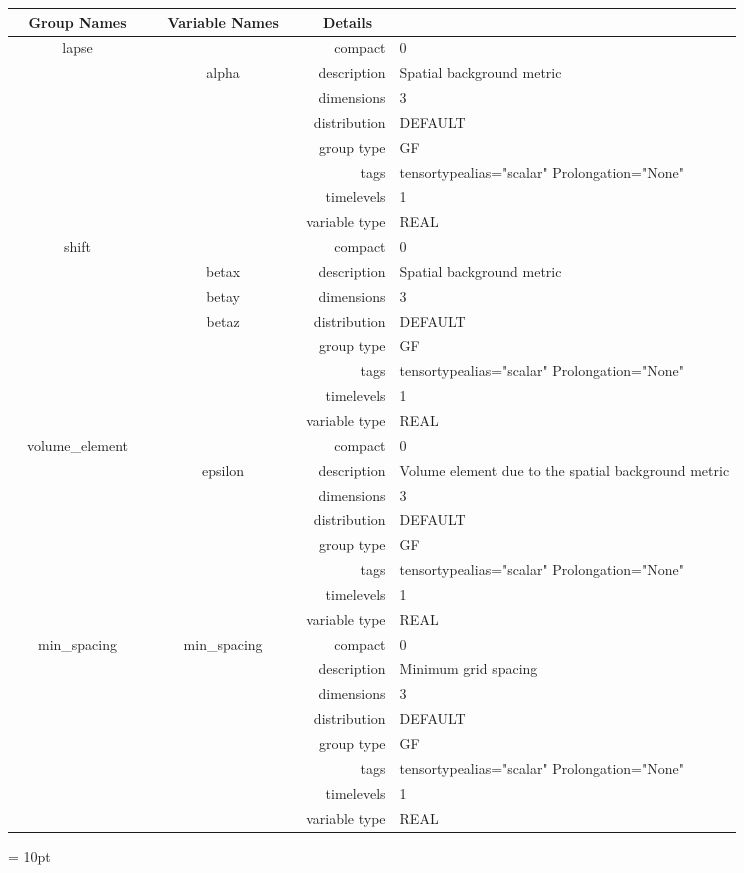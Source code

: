 \begin{tabular*}{150mm}{|c|c@{\extracolsep{\fill}}|rl|} \hline 
~ {\bf Group Names} ~ & ~ {\bf Variable Names} ~  &{\bf Details} ~ & ~ \\ 
\hline 
lapse &  & compact & 0 \\ 
 & alpha & description & Spatial background metric \\ 
 &  & dimensions & 3 \\ 
 &  & distribution & DEFAULT \\ 
 &  & group type & GF \\ 
 &  & tags & tensortypealias="scalar" Prolongation="None" \\ 
 &  & timelevels & 1 \\ 
 &  & variable type & REAL \\ 
\hline 
shift &  & compact & 0 \\ 
 & betax & description & Spatial background metric \\ 
 & betay & dimensions & 3 \\ 
 & betaz & distribution & DEFAULT \\ 
 &  & group type & GF \\ 
 &  & tags & tensortypealias="scalar" Prolongation="None" \\ 
 &  & timelevels & 1 \\ 
 &  & variable type & REAL \\ 
\hline 
volume\_element &  & compact & 0 \\ 
 & epsilon & description & Volume element due to the spatial background metric \\ 
 &  & dimensions & 3 \\ 
 &  & distribution & DEFAULT \\ 
 &  & group type & GF \\ 
 &  & tags & tensortypealias="scalar" Prolongation="None" \\ 
 &  & timelevels & 1 \\ 
 &  & variable type & REAL \\ 
\hline 
min\_spacing & min\_spacing & compact & 0 \\ 
 &  & description & Minimum grid spacing \\ 
 &  & dimensions & 3 \\ 
 &  & distribution & DEFAULT \\ 
 &  & group type & GF \\ 
 &  & tags & tensortypealias="scalar" Prolongation="None" \\ 
 &  & timelevels & 1 \\ 
 &  & variable type & REAL \\ 
\hline 
\end{tabular*} 



\vspace{5mm}\parskip = 10pt 
